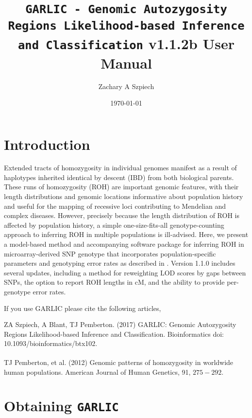\documentclass[12pt]{article}%
\title{{\tt GARLIC - Genomic Autozygosity Regions Likelihood-based Inference and Classification} v1.1.2b User Manual}
\date{\today}
\author{Zachary A Szpiech}
\begin{document}
\lstset{breaklines=true,basicstyle=\ttfamily}

\null  %
\nointerlineskip  %
\vfill
\let\snewpage \newpage
\let\newpage \relax
\maketitle
\thispagestyle{empty}
\let \newpage \snewpage
\vfill 
\break %

\tableofcontents 

\newpage

\section{Introduction}

Extended tracts of homozygosity in individual genomes manifest as a result of haplotypes inherited identical by descent (IBD) from both biological parents. These runs of homozygosity (ROH) are important genomic features, with their length distributions and genomic locations informative about population history and useful for the mapping of recessive loci contributing to Mendelian and complex diseases. However, precisely because the length distribution of ROH is affected by population history, a simple one-size-fits-all genotype-counting approach to inferring ROH in multiple populations is ill-advised. Here, we present a model-based method and accompanying software package for inferring ROH in microarray-derived SNP genotype that incorporates population-specific parameters and genotyping error rates as described in \cite{PembertonEtAl12:AJHG}. Version 1.1.0 includes several updates, including a method for reweighting LOD scores by gaps between SNPs, the option to report ROH lengths in cM, and the ability to provide per-genotype error rates.

If you use GARLIC please cite the following articles,

\noindent ZA Szpiech, A Blant, TJ Pemberton. (2017) GARLIC: Genomic Autozygosity Regions Likelihood-based Inference and Classification. Bioinformatics doi: 10.1093/bioinformatics/btx102.
\\\\
TJ Pemberton, et al. (2012) Genomic patterns of homozygosity in worldwide human populations. American Journal of Human Genetics, 91, $275-292$.

\section{Obtaining {\tt GARLIC}}
\end{document}
